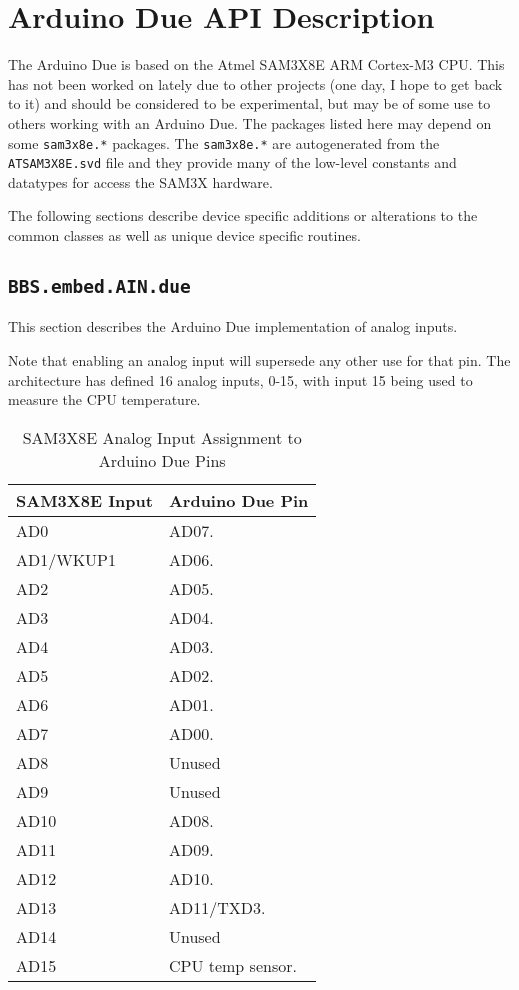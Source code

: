 \documentclass[10pt, openany]{book}
\newcommand{\package}[1]{\texttt{#1}}
\newcommand{\filename}[1]{\texttt{#1}}
\begin{document}
\chapter{Arduino Due API Description}
The Arduino Due is based on the Atmel SAM3X8E ARM Cortex-M3 CPU\cite{SAM3X}.  This has not been worked on lately due to other projects (one day, I hope to get back to it) and should be considered to be experimental, but may be of some use to others working with an Arduino Due.  The packages listed here may depend on some \package{sam3x8e.*} packages.  The \package{sam3x8e.*} are autogenerated from the \filename{ATSAM3X8E.svd} file and they provide many of the low-level constants and datatypes for access the SAM3X hardware.

The following sections describe device specific additions or alterations to the common classes as well as unique device specific routines.

\section{\package{BBS.embed.AIN.due}}
This section describes the Arduino Due implementation of analog inputs.

Note that enabling an analog input will supersede any other use for that pin.  The architecture has defined 16 analog inputs, 0-15, with input 15 being used to measure the CPU temperature.

\begin{table}[!h]
\begin{center}
  \begin{tabular}{l|l}
    SAM3X8E Input & Arduino Due Pin \\
    \hline
    AD0 & AD07. \\
    AD1/WKUP1 & AD06. \\
    AD2 & AD05. \\
    AD3 & AD04. \\
    AD4 & AD03. \\
    AD5 & AD02. \\
    AD6 & AD01. \\
    AD7 & AD00. \\
    AD8 & Unused \\
    AD9 & Unused \\
    AD10 & AD08. \\
    AD11 & AD09. \\
    AD12 & AD10. \\
    AD13 & AD11/TXD3. \\
    AD14 & Unused \\
    AD15 & CPU temp sensor. \\
  \end{tabular}
  \caption{SAM3X8E Analog Input Assignment to Arduino Due Pins}
  \label{tbl:ArduinoDueAIN}
\end{center}
\end{table}
\end{document}
